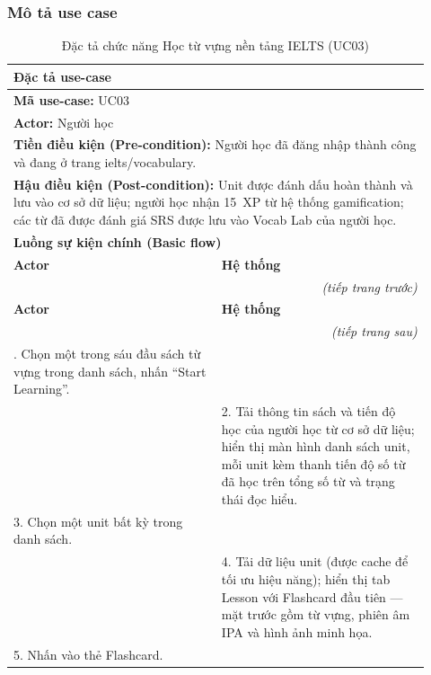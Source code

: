 \subsubsection{Mô tả use case}
\renewcommand{\arraystretch}{1.3}
\begin{longtable}{|p{0.46\linewidth}|p{0.46\linewidth}|}
    \caption{Đặc tả chức năng Học từ vựng nền tảng IELTS (UC03)} \label{tab:uc03_spec} \\
    \hline
    \multicolumn{2}{|l|}{\textbf{Đặc tả use-case}} \\ \hline
    \multicolumn{2}{|l|}{\textbf{Mã use-case:} UC03} \\ \hline
    \multicolumn{2}{|l|}{\textbf{Actor:} Người học} \\ \hline
    \multicolumn{2}{|p{0.88\linewidth}|}{\textbf{Tiền điều kiện (Pre-condition):} Người học đã đăng nhập thành công và đang ở trang ielts/vocabulary.} \\ \hline
    \multicolumn{2}{|p{0.88\linewidth}|}{\textbf{Hậu điều kiện (Post-condition):} Unit được đánh dấu hoàn thành và lưu vào cơ sở dữ liệu; người học nhận 15~XP từ hệ thống gamification; các từ đã được đánh giá SRS được lưu vào Vocab Lab của người học.} \\ \hline
    \multicolumn{2}{|l|}{\textbf{Luồng sự kiện chính (Basic flow)}} \\ \hline
    \textbf{Actor} & \textbf{Hệ thống} \\ \hline
    \endfirsthead
    \multicolumn{2}{r}{\textit{(tiếp trang trước)}} \\
    \hline
    \textbf{Actor} & \textbf{Hệ thống} \\ \hline
    \endhead
    \hline
    \multicolumn{2}{r}{\textit{(tiếp trang sau)}} \\
    \endfoot
    \hline
    \endlastfoot
    1. Chọn một trong sáu đầu sách từ vựng trong danh sách, nhấn ``Start Learning''. & \\ \hline
    & 2. Tải thông tin sách và tiến độ học của người học từ cơ sở dữ liệu; hiển thị màn hình danh sách unit, mỗi unit kèm thanh tiến độ số từ đã học trên tổng số từ và trạng thái đọc hiểu. \\ \hline
    3. Chọn một unit bất kỳ trong danh sách. & \\ \hline
    & 4. Tải dữ liệu unit (được cache để tối ưu hiệu năng); hiển thị tab Lesson với Flashcard đầu tiên --- mặt trước gồm từ vựng, phiên âm IPA và hình ảnh minh họa. \\ \hline
    5. Nhấn vào thẻ Flashcard. & \\ \hline

\end{longtable}
